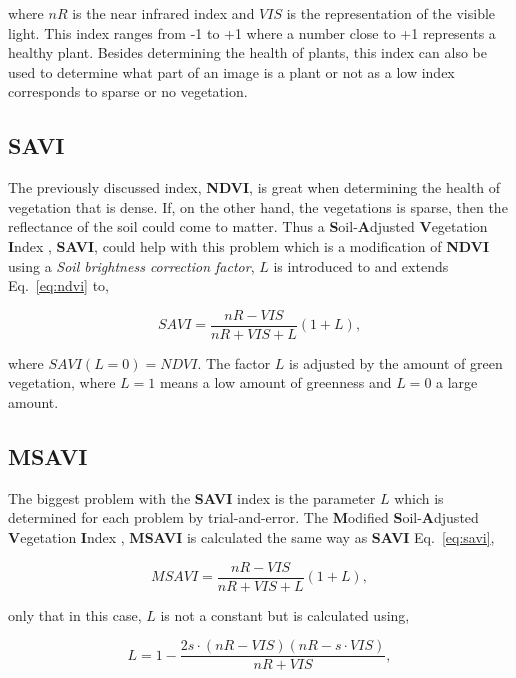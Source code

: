 where $nR$ is the near infrared index and $VIS$ is the representation of the visible light. This index ranges from -1 to +1 where a number close to +1 represents a healthy plant. Besides determining the health of plants, this index can also be used to determine what part of an image is a plant or not as a low index corresponds to sparse or no vegetation.

\subsection{SAVI}

The previously discussed index, \textbf{NDVI}, is great when determining the health of vegetation that is dense. If, on the other hand, the vegetations is sparse, then the reflectance of the soil could come to matter. Thus a \textbf{S}oil-\textbf{A}djusted \textbf{V}egetation \textbf{I}ndex \cite{saviSource}, \textbf{SAVI}, could help with this problem which is a modification of \textbf{NDVI} using a \textit{Soil brightness correction factor}, $L$ is introduced to and extends Eq.~\eqref{eq:ndvi} to,

\begin{equation}
	\label{eq:savi}
	SAVI=\frac{nR-VIS}{nR+VIS+L}(1+L),
\end{equation}

where $SAVI(L=0)=NDVI$. The factor $L$ is adjusted by the amount of green vegetation, where $L=1$ means a low amount of greenness and $L=0$ a large amount.

\subsection{MSAVI}

The biggest problem with the \textbf{SAVI} index is the parameter $L$ which is determined for each problem by trial-and-error. The \textbf{M}odified \textbf{S}oil-\textbf{A}djusted \textbf{V}egetation \textbf{I}ndex \cite{msaviSource}, \textbf{MSAVI} is calculated the same way as \textbf{SAVI} Eq.~\eqref{eq:savi},

\begin{equation}
    MSAVI = \frac{nR-VIS}{nR+VIS+L}(1+L),
\end{equation}

only that in this case, $L$ is not a constant but is calculated using,

\begin{equation}
	L = 1-\frac{2s\cdot(nR-VIS)(nR-s\cdot VIS)}{nR + VIS},
\end{equation}

